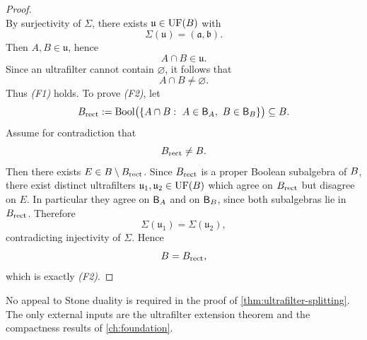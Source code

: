 \begin{proof}
\[	\]
	By surjectivity of \(\Sigma\), there exists \(\mathfrak u\in\operatorname{UF}(B)\)
	with
	\[
		\Sigma(\mathfrak u)=(\mathfrak a,\mathfrak b).
	\]
	Then \(A,B\in\mathfrak u\), hence
	\[
		A\cap B\in\mathfrak u.
	\]
	Since an ultrafilter cannot contain \(\varnothing\), it follows that
	\[
		A\cap B\neq\varnothing.
	\]
	Thus \emph{(F1)} holds.
	To prove \emph{(F2)}, let
	\[
		B_{\mathrm{rect}}
		:=
		\operatorname{Bool}\bigl(\{A\cap B:\ A\in\mathsf B_A,\ B\in\mathsf B_B\}\bigr)
		\subseteq B.
	\]
	Assume for contradiction that
	\[
		B_{\mathrm{rect}}\neq B.
	\]
	Then there exists \(E\in B\setminus B_{\mathrm{rect}}\). Since
	\(B_{\mathrm{rect}}\) is a proper Boolean subalgebra of \(B\), there
	exist distinct ultrafilters \(\mathfrak u_1,\mathfrak u_2\in\operatorname{UF}(B)\)
	which agree on \(B_{\mathrm{rect}}\) but disagree on \(E\). In
	particular they agree on \(\mathsf B_A\) and on \(\mathsf B_B\), since both
	subalgebras lie in \(B_{\mathrm{rect}}\). Therefore
	\[
		\Sigma(\mathfrak u_1)=\Sigma(\mathfrak u_2),
	\]
	contradicting injectivity of \(\Sigma\). Hence
	\[
		B=B_{\mathrm{rect}},
	\]
	which is exactly \emph{(F2)}.
\end{proof}
\begin{remark}
	No appeal to Stone duality is required in the proof of
	\cref{thm:ultrafilter-splitting}. The only external inputs are the
	ultrafilter extension theorem and the compactness results of
	\cref{ch:foundation}.
\end{remark}

